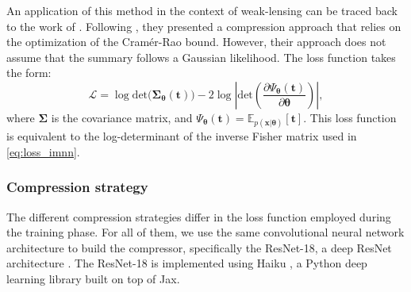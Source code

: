 \documentclass{aa}
\begin{document}
An application of this method in the context of weak-lensing can be traced back to the work of \citet{fluri2021cosmological, fluri2022full}. Following \citet{charnock2018automatic}, they presented a compression approach that relies on the optimization of the Cramér-Rao bound. However, their approach does not assume that the summary follows a Gaussian likelihood. The loss function takes the form:
\begin{equation}\label{eq:loss_gfim}
\mathcal{L}=\log{\text{det}(\bm{\Sigma}_{\bm{\theta}}(\bm{t})})-2\log{\left|\text{det}\left(\frac{\partial \Psi_{\bm{\theta}}(\bm{t})}{\partial \bm{\theta}}\right)\right|},
\end{equation}
where $\bm{\Sigma}$ is the covariance matrix, and $\Psi_{\bm{\theta}}(\bm{t})=\mathbb{E}_{p(\bm {x}|\bm {\theta})}[\bm{t}]$.
This loss function is equivalent to the log-determinant of the inverse Fisher matrix used in \autoref{eq:loss_imnn}. \\
\subsubsection{Compression strategy}
The different compression strategies differ in the loss function employed during the training phase. For all of them, we use the same convolutional neural network architecture to build the compressor, specifically the ResNet-18, a deep ResNet architecture \citep{he2016deep}. The ResNet-18 is implemented using Haiku \citep{haiku2020github}, a Python deep learning library built on top of Jax.
\end{document}
